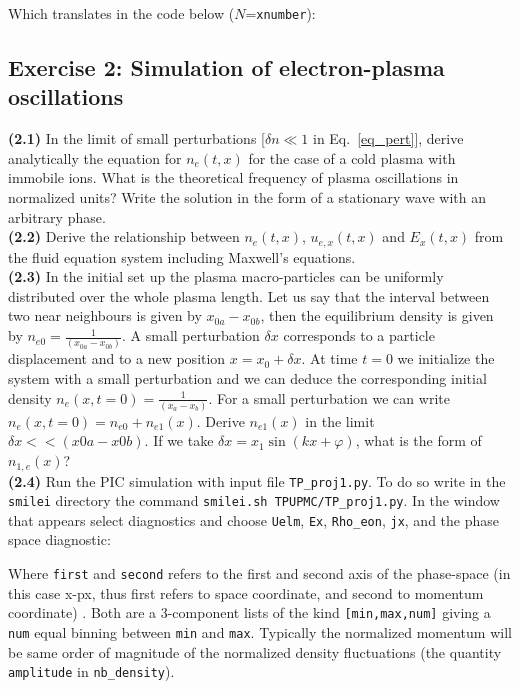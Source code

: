 \documentclass[11pt,a4paper]{article}
\begin{document}
Which translates in the code below ($N$=\texttt{xnumber}):



\subsection*{Exercise 2: Simulation of electron-plasma oscillations}

{\bf (2.1)} In the limit of small perturbations [$\delta n \ll 1$ in Eq.~\eqref{eq_pert}], derive analytically the equation for $n_e(t,x)$ for the case of a cold plasma with immobile ions.   What is the theoretical frequency of plasma oscillations in normalized units? Write the solution in the form of a stationary wave with an arbitrary phase.\\
{\bf (2.2)} Derive the relationship between $n_e(t,x)$, $u_{e,x}(t,x)$ and $E_x(t,x)$ from the fluid equation system including Maxwell's equations.\\
{\bf (2.3)} In the initial set up the plasma macro-particles  can be uniformly distributed over the whole plasma length. Let us say that the interval between two near neighbours is given by  $x_{0a}-x_{0b}$, then   the equilibrium density is given by  $n_{e0} = \frac{1}{(x_{0a}-x_{0b})}$. A small perturbation $\delta x$  corresponds to a particle displacement and to a new position  $x = x_0 +  \delta x$. At time $t=0$ we initialize the system with a small perturbation and we can deduce the corresponding initial density  $n_e(x,t=0)= \frac{1}{(x_{a}-x_{b})}$. For a small perturbation we can write  $n_e(x,t=0)=n_{e0}+n_{e1}(x)$. Derive   $n_{e1}(x)$ in the limit  $\delta x << (x0a-x0b)$. If we take  $\delta x = x_1 \sin(kx +\varphi)$, what is the form of $n_{1,e}(x)$? \\
{\bf (2.4)} Run the PIC simulation with input file \texttt{TP\_proj1.py}. To do so write in the \texttt{smilei} directory the command 
\texttt{smilei.sh TPUPMC/TP\_proj1.py}. In the window that appears select diagnostics and choose \texttt{Uelm}, \texttt{Ex}, \texttt{Rho\_eon}, \texttt{jx}, and the phase space diagnostic:



Where \texttt{first} and \texttt{second} refers to the first and second axis of the phase-space (in this case x-px, thus first refers to space coordinate, and second to momentum coordinate) . Both are a 3-component lists of the kind \texttt{[min,max,num]} giving a \texttt{num} equal binning between \texttt{min} and \texttt{max}. Typically the normalized momentum will be same order of magnitude of the normalized density fluctuations (the quantity  \texttt{amplitude} in \texttt{nb\_density}).
\end{document}
